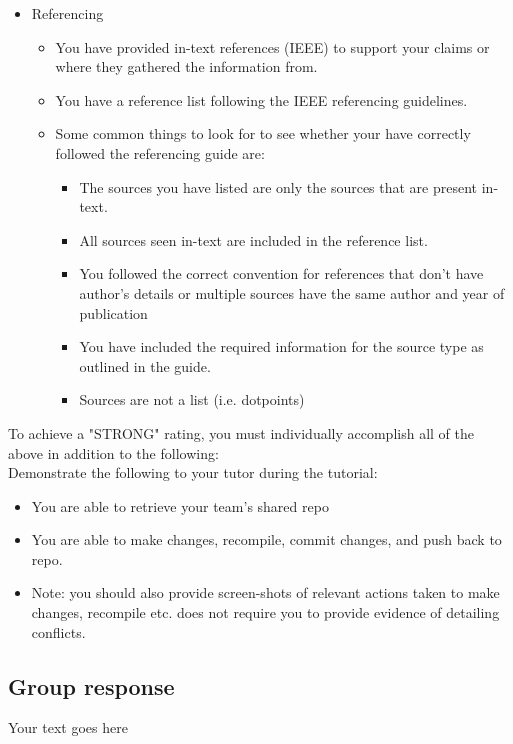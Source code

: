 \documentclass[a4paper, 11pt]{report}
\begin{document}
\begin{itemize}
\begin{itemize}
	\end{itemize}
\item Referencing
	\begin{itemize}
	\item You have provided in-text references (IEEE) to support your claims or where they gathered the information from.
	\item You have a reference list following the IEEE referencing guidelines.
	\item Some common things to look for to see whether your have correctly followed the referencing guide are:
		\begin{itemize}
		\item The sources you have listed are only the sources that are present in-text.
		\item All sources seen in-text are included in the reference list.
		\item You followed the correct convention for references that don’t have author’s details or multiple sources have the same author and year of publication
		\item You have included the required information for the source type as outlined in the guide.
		\item Sources are not a list (i.e. dotpoints)
		\end{itemize}
	\end{itemize}
\end{itemize}

To achieve a "STRONG" rating, you must individually accomplish all of the above in addition to the following:\\
Demonstrate the following to your tutor during the tutorial:
\begin{itemize}
\item You are able to retrieve your team’s shared repo
\item You are able to make changes, recompile, commit changes, and push back to repo.
\item Note: you should also provide screen-shots of relevant actions taken to make changes, recompile etc. does not require you to provide evidence of detailing conflicts.
\end{itemize}


\subsection{Group response}

Your text goes here
\end{document}

